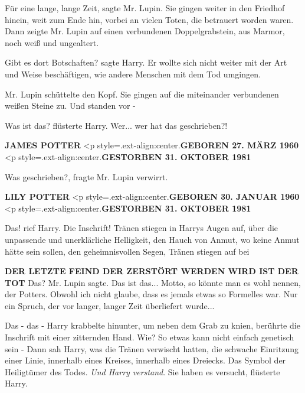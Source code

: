 \glqq{}Für eine lange, lange Zeit\grqq{}, sagte Mr. Lupin. Sie gingen weiter in
den Friedhof hinein, weit zum Ende hin, vorbei an vielen Toten, die betrauert
worden waren. Dann zeigte Mr. Lupin auf einen verbundenen Doppelgrabstein, aus
Marmor, noch weiß und ungealtert.

\glqq{}Gibt es dort Botschaften?\grqq{} sagte Harry. Er wollte sich nicht weiter
mit der Art und Weise beschäftigen, wie andere Menschen mit dem Tod umgingen.

Mr. Lupin schüttelte den Kopf. Sie gingen auf die miteinander verbundenen weißen
Steine zu. Und standen vor -

\glqq{}Was ist das?\grqq{} flüsterte Harry. \glqq{}Wer... wer hat das
geschrieben?!\grqq{}

\textbf{JAMES POTTER}   <p
style=\grqq{}.ext-align:center\grqq{}.\textbf{GEBOREN 27. MÄRZ 1960}   <p
style=\grqq{}.ext-align:center\grqq{}.\textbf{GESTORBEN 31. OKTOBER 1981}

\glqq{}Was geschrieben?\grqq{}, fragte Mr. Lupin verwirrt.

\textbf{LILY POTTER}   <p
style=\grqq{}.ext-align:center\grqq{}.\textbf{GEBOREN 30. JANUAR 1960}   <p
style=\grqq{}.ext-align:center\grqq{}.\textbf{GESTORBEN 31. OKTOBER 1981}

\glqq{}Das!\grqq{} rief Harry. \glqq{}Die Inschrift!\grqq{} Tränen stiegen in
Harrys Augen auf, über die unpassende und unerklärliche Helligkeit, den Hauch
von Anmut, wo keine Anmut hätte sein sollen, den geheimnisvollen Segen, Tränen
stiegen auf bei

\textbf{DER LETZTE FEIND DER ZERSTÖRT
WERDEN WIRD IST DER TOT}     \glqq
Das?\grqq{} Mr. Lupin sagte. \glqq{}Das ist das... Motto, so könnte man es wohl
nennen, der Potters. Obwohl ich nicht glaube, dass es jemals etwas so Formelles
war. Nur ein Spruch, der vor langer, langer Zeit überliefert wurde...\grqq{}

\glqq{}Das - das -\grqq{} Harry krabbelte hinunter, um neben dem Grab zu knien,
berührte die Inschrift mit einer zitternden Hand. \glqq{}Wie? So etwas kann nicht
einfach genetisch sein -\grqq{} Dann sah Harry, was die Tränen verwischt hatten,
die schwache Einritzung einer Linie, innerhalb eines Kreises, innerhalb eines
Dreiecks. Das Symbol der Heiligtümer des Todes. \emph{Und Harry verstand}. \glqq
Sie haben es versucht\grqq{}, flüsterte Harry.

